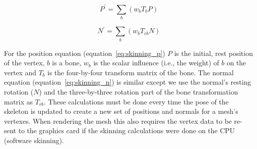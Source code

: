 \begin{equation}
 \label{eq:skinning_p}
  P^\prime = \sum_b{\left(w_bT_bP\right)}
\end{equation}

\begin{equation}
 \label{eq:skinning_n}
 N^\prime = \sum_b{\left(w_bT_{rb}N\right)}
\end{equation}

For the position equation (equation~\ref{eq:skinning_p}) $P$ is the initial, rest position of the vertex, $b$ is a bone, $w_b$ is the scalar influence (i.e., the weight) of $b$ on the vertex and $T_b$ is the four-by-four transform matrix of the bone.
The normal equation (equation~\ref{eq:skinning_n}) is similar except we use the normal's resting rotation ($N$) and the three-by-three rotation part of the bone transformation matrix as $T_{rb}$.
These calculations must be done every time the pose of the skeleton is updated to create a new set of positions and normals for a mesh's vertexes.
When rendering the mesh this also requires the vertex data to be re-sent to the graphics card if the skinning calculations were done on the CPU (software skinning).

